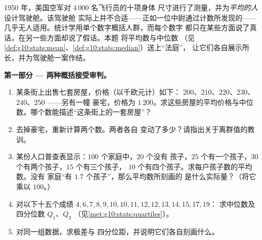 \begin{problem}
\label{pb:g10:stats:1}
1950 年，美国空军对 $4\,000$ 名飞行员的十项身体
尺寸进行了测量，并为\emph{平均的人}设计驾驶舱。该驾驶舱
实际上并不合适——正如一位中尉通过计数所发现的——
几乎无人适用。统计学用单个数字概括人群，而每个数字
都只在某些方面说了真话，在另一些方面却说了假话。本题
将平均数与中位数
（见\cref{def:g10:stats:mean}、\cref{def:g10:stats:median}）送上“法庭”，
让它们各自展示所长，并为驾驶舱一案作结。

\medskip
\noindent\textbf{第一部分 --- 两种概括接受审判。}
\begin{enumerate}
  \item 某条街上出售七套房屋，价格（以千欧元计）如下：
        $200$、$210$、$220$、$230$、$240$、$250$ ——另有一幢
        豪宅，价格为 $1\,200$。求这些房屋的平均价格与中位
        数。哪个数能描述“这条街上的一套房屋”？
  \item 去掉豪宅，重新计算两个数。两者各自
        变动了多少？请指出关于离群值的教训。
  \item 某份人口普查表显示：$100$ 个家庭中，$20$ 个没有
        孩子，$25$ 个有一个孩子，$30$ 个有两个孩子，$15$ 个有三个孩子，
        $10$ 个有四个孩子。求每户孩子数的平均数。没有
        家庭“有 $1.7$ 个孩子”，那么平均数所刻画的
        是什么实际量？（将它乘以 $100$。）
  \item 对以下十五个成绩
        $4, 6, 7, 8, 9, 10, 10, 11, 12, 12, 13, 14, 15, 17, 19$：
        求中位数及四分位数 $Q_1$、$Q_3$
        （见\cref{met:g10:stats:quartiles}）。
  \item 对同一组数据，求极差与
        四分位距，并说明它们各自刻画什么。
\end{enumerate}


\end{problem}
